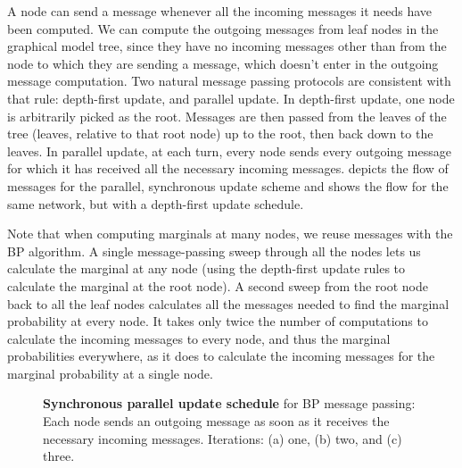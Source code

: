 A node can send a message whenever all the incoming messages it needs
have been computed.  We can compute the outgoing messages
from leaf nodes in the graphical model tree, since they have no
incoming messages other than from the node to which they are sending a
message, which doesn't enter in the outgoing message computation.  Two
natural message passing protocols are consistent with that rule:
depth-first update, and parallel update.  In depth-first update, one
node is arbitrarily picked as the root.  Messages are then passed from
the leaves of the tree (leaves, relative to that root node) up to the
root, then back down to the leaves.  In parallel update, at each turn,
every node sends every outgoing message for which it has received all
the necessary incoming messages.  \Fig{\ref{fig:men}} depicts the
flow of messages for the parallel, synchronous update scheme and \Fig{\ref{fig:men2}} shows the flow for the same network, but with a depth-first update schedule.

Note that when computing marginals at many nodes, we reuse messages
with the BP algorithm.  A single message-passing sweep through all the
nodes lets us calculate the marginal at any node (using the
depth-first update rules to calculate the marginal at the root node).
A second sweep from the root node back to all the leaf nodes
calculates all the messages needed to find the marginal probability at
every node.  It takes only twice the number of computations to
calculate the incoming messages to every node, and thus the marginal probabilities everywhere, as it does to
calculate the incoming messages for the marginal probability at a single node.

\begin{figure}
\centerline{
}
\caption{{\bf Synchronous parallel update schedule} for BP message passing: Each node sends an outgoing message as soon as it receives the necessary incoming messages. Iterations: (a) one, (b) two, and (c) three.} 
\label{fig:men}
\end{figure}




